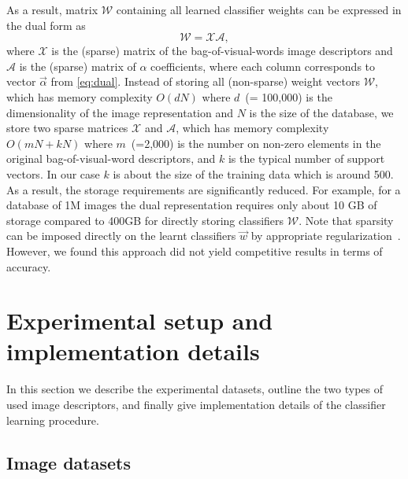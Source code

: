    
    As a result, matrix $\mathcal{W}$ containing all learned classifier weights can be expressed in the dual form as
      \begin{equation}
        \label{eq:dualFinal}
        \mathcal{W} = \mathcal{X} \mathcal{A},  
      \end{equation}
    \noindent
    where $\mathcal{X}$ is the (sparse) matrix of the bag-of-visual-words image descriptors and $\mathcal{A}$ is the (sparse) matrix of $\alpha$ coefficients, 
    where each column corresponds to vector $\vec{\alpha}$ from \eqref{eq:dual}. 
    Instead of storing all (non-sparse) weight vectors $\mathcal{W}$, which has memory complexity $O(dN)$ where $d$~(= 100,000) is the dimensionality of the image representation and $N$ is the size of the database, we store two sparse matrices $\mathcal{X}$ and $\mathcal{A}$, which has memory complexity $O(mN+kN)$ where $m$~(=2,000) is the number on non-zero elements in the original bag-of-visual-word descriptors, and $k$ is the typical number of support vectors. In our case $k$ is about the size of the training data which is around 500. As a result, the storage requirements are significantly reduced. For example, for a database of 1M images the dual representation requires only about 10 GB of storage compared to 400GB for directly storing classifiers $\mathcal{W}$.  
    Note that sparsity can be imposed directly on the learnt classifiers $\vec{w}$ by appropriate regularization~\cite{scholkopf2002learning}. However, we found this approach did not yield competitive results \textcolor{petr}{in terms of accuracy}.




\section{Experimental setup and implementation details}
\label{sec:experiments}
  In this section we describe the experimental datasets, outline the two types of used image descriptors, and finally give implementation details of the classifier learning procedure.
  

  \subsection{Image datasets}
